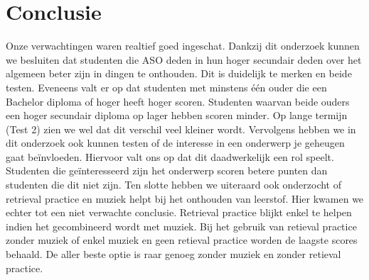 \documentclass{hogent-article}
\begin{document}
	\section{Conclusie}
	Onze verwachtingen waren realtief goed ingeschat. Dankzij dit onderzoek kunnen we besluiten dat studenten die ASO deden in hun hoger secundair deden over het algemeen beter zijn in dingen te onthouden. Dit is duidelijk te merken en beide testen. Eveneens valt er op dat studenten met minstens één ouder die een Bachelor diploma of hoger heeft hoger scoren. Studenten waarvan beide ouders een hoger secundair diploma op lager hebben scoren minder. Op lange termijn (Test 2) zien we wel dat dit verschil veel kleiner wordt. Vervolgens hebben we in dit onderzoek ook kunnen testen of de interesse in een onderwerp je geheugen gaat beïnvloeden. Hiervoor valt ons op dat dit daadwerkelijk een rol speelt. Studenten die geïnteresseerd zijn het onderwerp scoren betere punten dan studenten die dit niet zijn. Ten slotte hebben we uiteraard ook onderzocht of retrieval practice en muziek helpt bij het onthouden van leerstof. Hier kwamen we echter tot een niet verwachte conclusie. Retrieval practice blijkt enkel te helpen indien het gecombineerd wordt met muziek. Bij het gebruik van retieval practice zonder muziek of enkel muziek en geen retieval practice worden de laagste scores behaald. De aller beste optie is raar genoeg zonder muziek en zonder retieval practice.
	
	
	
	\printbibliography[heading=bibintoc]
	
\end{document}
